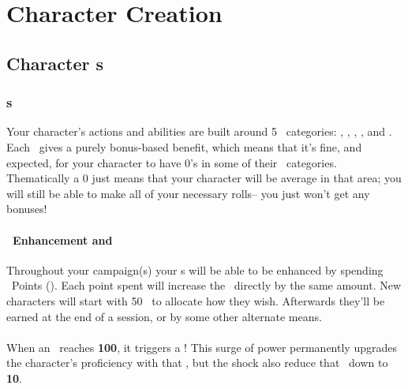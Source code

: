 \part{Character Creation}\label{part:char_creation}
\chapter{Character \attribute s}\label{ch:char_attributes}

\section{\attribute s}\label{sec:attributes}
Your character's actions and abilities are built around 5 \attribute\ 
categories: \POWEful, \KNOWful, \ENDUful, \SPEDful, and \FOREful. Each \attribute\  gives a purely
bonus-based benefit, which means that it's fine, and expected, for
your character to have 0's in some of their \attribute\  categories.
Thematically a 0 just means that your character will be average in that
area; you will still be able to make all of your necessary rolls--
you just won't get any bonuses! 

\subsection{\attribute\ Enhancement and \attrval}\label{subsec:attr_points}
Throughout your campaign(s) your \attribute s will be able to be enhanced by spending \attribute\ Points (\attrval). Each point spent will increase the \attribute\ directly by the same amount. New characters will start with 50 \attrval\ to allocate how they wish. Afterwards they'll be earned at the end of a session, or by some other alternate means.


\subsection{\BURST\index{\BURST}}\label{subsec:BURST}
When an \attribute\ reaches \textbf{100}, it triggers a \BURST !
This surge of power permanently upgrades the character's proficiency with that \attribute , but the shock also reduce that \attribute\ down to \textbf{10}.

